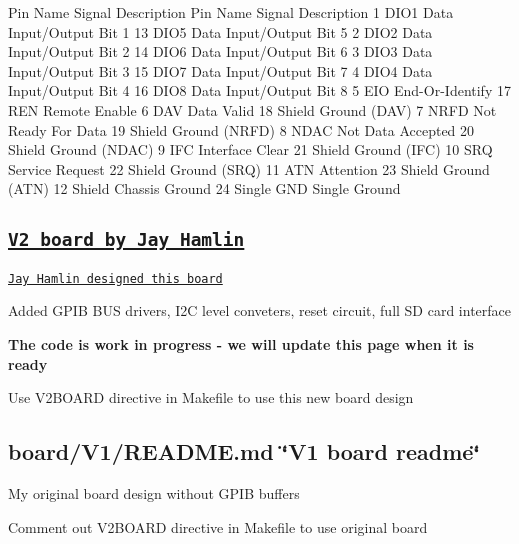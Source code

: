\begin{DoxyPre}
    Pin Name   Signal Description       Pin Name   Signal Description 
    1   DIO1   Data Input/Output Bit 1  13  DIO5   Data Input/Output Bit 5 
    2   DIO2   Data Input/Output Bit 2  14  DIO6   Data Input/Output Bit 6 
    3   DIO3   Data Input/Output Bit 3  15  DIO7   Data Input/Output Bit 7 
    4   DIO4   Data Input/Output Bit 4  16  DIO8   Data Input/Output Bit 8 
    5   EIO    End-Or-Identify          17  REN    Remote Enable 
    6   DAV    Data Valid               18  Shield Ground (DAV) 
    7   NRFD   Not Ready For Data       19  Shield Ground (NRFD) 
    8   NDAC   Not Data Accepted        20  Shield Ground (NDAC) 
    9   IFC    Interface Clear          21  Shield Ground (IFC) 
    10  SRQ    Service Request          22  Shield Ground (SRQ) 
    11  ATN    Attention                23  Shield Ground (ATN) 
    12  Shield Chassis Ground           24  Single GND Single Ground
\end{DoxyPre}


\subsection*{\href{board/V2/release}{\tt V2 board by Jay Hamlin}}


\begin{DoxyItemize}
\item \href{board/V2/releases}{\tt Jay Hamlin designed this board}
\item Added G\+P\+IB B\+US drivers, I2C level conveters, reset circuit, full SD card interface
\item {\bfseries The code is work in progress -\/ we will update this page when it is ready}
\item Use V2\+B\+O\+A\+RD directive in Makefile to use this new board design 


\end{DoxyItemize}

\subsection*{board/\+V1/\+R\+E\+A\+D\+M\+E.\+md \char`\"{}\+V1 board readme\char`\"{}}


\begin{DoxyItemize}
\item My original board design without G\+P\+IB buffers
\item Comment out V2\+B\+O\+A\+RD directive in Makefile to use original board 


\end{DoxyItemize}

